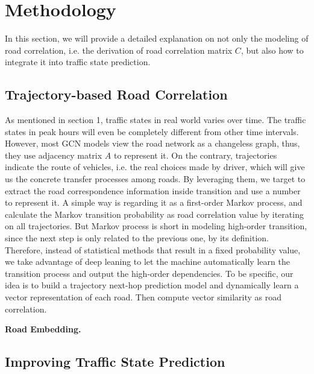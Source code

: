 
\section{Methodology}
In this section, we will provide a detailed explanation on not only the modeling of road correlation, i.e. the derivation of road correlation matrix $C$, but also how to integrate it into traffic state prediction.

\subsection{Trajectory-based Road Correlation}
As mentioned in section 1, traffic states in real world varies over time. The traffic states in peak hours will even be completely different from other time intervals. However, most GCN models view the road network as a changeless graph, thus, they use adjacency matrix $A$ to represent it. On the contrary, trajectories indicate the route of vehicles, i.e. the real choices made by driver, which will give us the concrete transfer processes among roads. By leveraging them, we target to extract the road correspondence information inside transition and use a number to represent it. A simple way is regarding it as a first-order Markov process\cite{AAAI21}, and calculate the Markov transition probability as road correlation value by iterating on all trajectories. But Markov process is short in modeling high-order transition, since the next step is only related to the previous one, by its definition. Therefore, instead of statistical methods that result in a fixed probability value, we take advantage of deep leaning to let the machine automatically learn the transition process and output the high-order dependencies. To be specific, our idea is to build a trajectory next-hop prediction model and dynamically learn a vector representation of each road. Then compute vector similarity as road correlation.

\vspace{\baselineskip}

\textbf{Road Embedding.} 

\subsection{Improving Traffic State Prediction}
